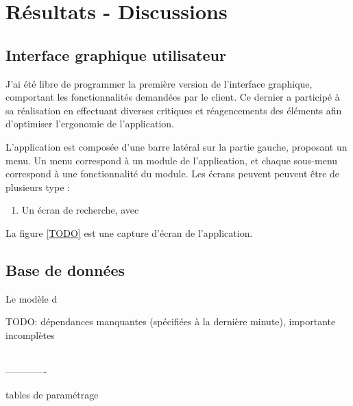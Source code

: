 \cleardoublepage

\chapter{Résultats - Discussions}



\section{Interface graphique utilisateur}

J'ai été libre de programmer la première version de l'interface graphique, comportant les fonctionnalités demandées par le client. Ce dernier a participé à sa réalisation en effectuant diverses critiques et réagencements des éléments afin d'optimiser l'ergonomie de l'application.

L'application est composée d'une barre latéral sur la partie gauche, proposant un menu. Un menu correspond à un module de l'application, et chaque sous-menu correspond à une fonctionnalité du module. Les écrans peuvent peuvent être de plusieurs type :
\begin{enumerate}
	\item Un écran de recherche, avec 
\end{enumerate}

La figure \ref{TODO} est une capture d'écran de l'application.


\section{Base de données}

Le modèle d

TODO: dépendances manquantes (spécifiées à la dernière minute), importante incomplètes



~~\\-------------

tables de paramétrage
